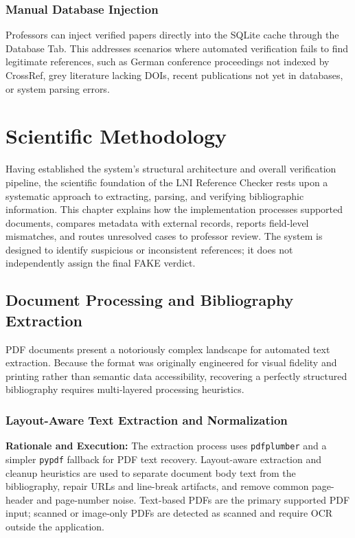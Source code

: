 \documentclass[12pt,a4paper,oneside]{report}
\begin{document}
\subsection{Manual Database Injection}

Professors can inject verified papers directly into the SQLite cache through the Database Tab. This addresses scenarios where automated verification fails to find legitimate references, such as German conference proceedings not indexed by CrossRef, grey literature lacking DOIs, recent publications not yet in databases, or system parsing errors.



\chapter{Scientific Methodology}

Having established the system's structural architecture and overall verification pipeline, the scientific foundation of the LNI Reference Checker rests upon a systematic approach to extracting, parsing, and verifying bibliographic information. This chapter explains how the implementation processes supported documents, compares metadata with external records, reports field-level mismatches, and routes unresolved cases to professor review. The system is designed to identify suspicious or inconsistent references; it does not independently assign the final FAKE verdict.

\section{Document Processing and Bibliography Extraction}

PDF documents present a notoriously complex landscape for automated text extraction. Because the format was originally engineered for visual fidelity and printing rather than semantic data accessibility, recovering a perfectly structured bibliography requires multi-layered processing heuristics.

\subsection{Layout-Aware Text Extraction and Normalization}

\textbf{Rationale and Execution:} The extraction process uses \texttt{pdfplumber} \cite{singer2016} and a simpler \texttt{pypdf} fallback for PDF text recovery. Layout-aware extraction and cleanup heuristics are used to separate document body text from the bibliography, repair URLs and line-break artifacts, and remove common page-header and page-number noise. Text-based PDFs are the primary supported PDF input; scanned or image-only PDFs are detected as scanned and require OCR outside the application.
\end{document}

